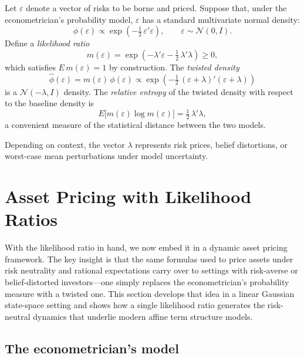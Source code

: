 \documentclass[12pt]{article}
\theoremstyle{definition}
\begin{document}
Let $\varepsilon$ denote a vector of risks to be borne and priced.
Suppose that, under the econometrician's probability model,
$\varepsilon$ has a standard multivariate normal density:
\[
   \phi(\varepsilon)  \propto \exp\!\left(- \tfrac{1}{2}\,
       \varepsilon' \varepsilon\right), \qquad
       \varepsilon \sim {\mathcal N}(0,I).
\]
Define a \emph{likelihood ratio}
\[
   m(\varepsilon)  = \exp \!\left( -\lambda' \varepsilon
       - \tfrac{1}{2}\, \lambda' \lambda \right) \geq 0,
\]
which satisfies $E\, m(\varepsilon) = 1$ by construction.  The
\emph{twisted density}
\[
   \hat \phi(\varepsilon)  =  m(\varepsilon)\, \phi(\varepsilon)
   \propto \exp\!\left( - \tfrac{1}{2}\,
       (\varepsilon + \lambda)'(\varepsilon + \lambda)\right)
\]
is a ${\mathcal N}(-\lambda, I)$ density.  The \emph{relative entropy}
of the twisted density with respect to the baseline density is
\[
   E\bigl[ m(\varepsilon) \log m(\varepsilon) \bigr]
       = \tfrac{1}{2}\, \lambda'\lambda,
\]
a convenient measure of the statistical distance between the two models.

 Depending on context,  the vector $\lambda$
represents risk prices, belief distortions, or worst-case mean
perturbations under model uncertainty.


\section{Asset Pricing with Likelihood Ratios}
\label{sec:asset-pricing}

With the likelihood ratio in hand, we now embed it in a dynamic asset
pricing framework.  The key insight is that the same formulas used to
price assets under risk neutrality and rational expectations carry over
to settings with risk-averse or belief-distorted investors---one simply
replaces the econometrician's probability measure with a twisted one.
This section develops that idea in a linear Gaussian state-space setting
and shows how a single likelihood ratio generates the risk-neutral
dynamics that underlie modern affine term structure models.

\subsection{The econometrician's model}
\end{document}
